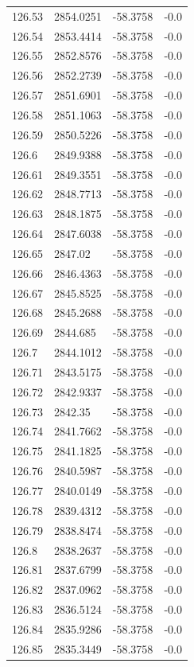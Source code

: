\begin{table}[H]
\begin{tabular}{llll}
126.53 & 2854.0251 & -58.3758 & -0.0 \\
126.54 & 2853.4414 & -58.3758 & -0.0 \\
126.55 & 2852.8576 & -58.3758 & -0.0 \\
126.56 & 2852.2739 & -58.3758 & -0.0 \\
126.57 & 2851.6901 & -58.3758 & -0.0 \\
126.58 & 2851.1063 & -58.3758 & -0.0 \\
126.59 & 2850.5226 & -58.3758 & -0.0 \\
126.6 & 2849.9388 & -58.3758 & -0.0 \\
126.61 & 2849.3551 & -58.3758 & -0.0 \\
126.62 & 2848.7713 & -58.3758 & -0.0 \\
126.63 & 2848.1875 & -58.3758 & -0.0 \\
126.64 & 2847.6038 & -58.3758 & -0.0 \\
126.65 & 2847.02 & -58.3758 & -0.0 \\
126.66 & 2846.4363 & -58.3758 & -0.0 \\
126.67 & 2845.8525 & -58.3758 & -0.0 \\
126.68 & 2845.2688 & -58.3758 & -0.0 \\
126.69 & 2844.685 & -58.3758 & -0.0 \\
126.7 & 2844.1012 & -58.3758 & -0.0 \\
126.71 & 2843.5175 & -58.3758 & -0.0 \\
126.72 & 2842.9337 & -58.3758 & -0.0 \\
126.73 & 2842.35 & -58.3758 & -0.0 \\
126.74 & 2841.7662 & -58.3758 & -0.0 \\
126.75 & 2841.1825 & -58.3758 & -0.0 \\
126.76 & 2840.5987 & -58.3758 & -0.0 \\
126.77 & 2840.0149 & -58.3758 & -0.0 \\
126.78 & 2839.4312 & -58.3758 & -0.0 \\
126.79 & 2838.8474 & -58.3758 & -0.0 \\
126.8 & 2838.2637 & -58.3758 & -0.0 \\
126.81 & 2837.6799 & -58.3758 & -0.0 \\
126.82 & 2837.0962 & -58.3758 & -0.0 \\
126.83 & 2836.5124 & -58.3758 & -0.0 \\
126.84 & 2835.9286 & -58.3758 & -0.0 \\
126.85 & 2835.3449 & -58.3758 & -0.0 \\

\end{tabular}
\end{table}
